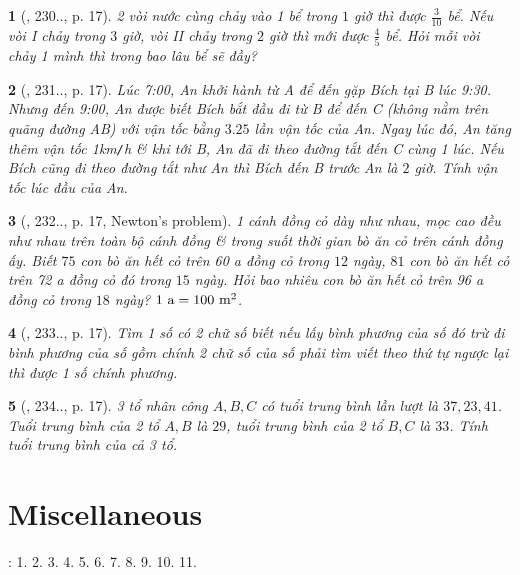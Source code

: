 \documentclass{article}
\newtheorem{baitoan}{}
\begin{document}
\begin{baitoan}[\cite{Binh_Toan_9_tap_2}, 230.., p. 17]
	2 vòi nước cùng chảy vào 1 bể trong $1$ giờ thì được $\frac{3}{10}$ bể. Nếu vòi I chảy trong $3$ giờ, vòi II chảy trong $2$ giờ thì mới được $\frac{4}{5}$ bể. Hỏi mỗi vòi chảy 1 mình thì trong bao lâu bể sẽ đầy?
\end{baitoan}

\begin{baitoan}[\cite{Binh_Toan_9_tap_2}, 231.., p. 17]
	Lúc {\rm7:00}, An khởi hành từ A để đến gặp Bích tại B lúc {\rm9:30}. Nhưng đến {\rm9:00}, An được biết Bích bắt đầu đi từ B để đến C (không nằm trên quãng đường AB) với vận tốc bằng $3.25$ lần vận tốc của An. Ngay lúc đó, An tăng thêm vận tốc {\rm1km{\tt/}h} \& khi tới B, An đã đi theo đường tắt đến C cùng 1 lúc. Nếu Bích cũng đi theo đường tắt như An thì Bích đến B trước An là $2$ giờ. Tính vận tốc lúc đầu của An.
\end{baitoan}

\begin{baitoan}[\cite{Binh_Toan_9_tap_2}, 232.., p. 17, Newton's problem]
	1 cánh đồng cỏ dày như nhau, mọc cao đều như nhau trên toàn bộ cánh đồng \& trong suốt thời gian bò ăn cỏ trên cánh đồng ấy. Biết $75$ con bò ăn hết cỏ trên {\rm60 a} đồng cỏ trong $12$ ngày, $81$ con bò ăn hết cỏ trên {\rm72 a} đồng cỏ đó trong $15$ ngày. Hỏi bao nhiêu con bò ăn hết cỏ trên {\rm96 a} đồng cỏ trong $18$ ngày? $\rm1\ a = 100\ m^2$.
\end{baitoan}

\begin{baitoan}[\cite{Binh_Toan_9_tap_2}, 233.., p. 17]
	Tìm 1 số có 2 chữ số biết nếu lấy bình phương của số đó trừ đi bình phương của số gồm chính 2 chữ số của số phải tìm viết theo thứ tự ngược lại thì được 1 số chính phương.
\end{baitoan}

\begin{baitoan}[\cite{Binh_Toan_9_tap_2}, 234.., p. 17]
	3 tổ nhân công $A,B,C$ có tuổi trung bình lần lượt là $37,23,41$. Tuổi trung bình của 2 tổ $A,B$ là $29$, tuổi trung bình của 2 tổ $B,C$ là $33$. Tính tuổi trung bình của cả 3 tổ.
\end{baitoan}


\section{Miscellaneous}
\cite[BTCCI, pp. 26--27]{SGK_Toan_9_Canh_Dieu_tap_1}: 1. 2. 3. 4. 5. 6. 7. 8. 9. 10. 11.


\printbibliography[heading=bibintoc]
	
\end{document}

